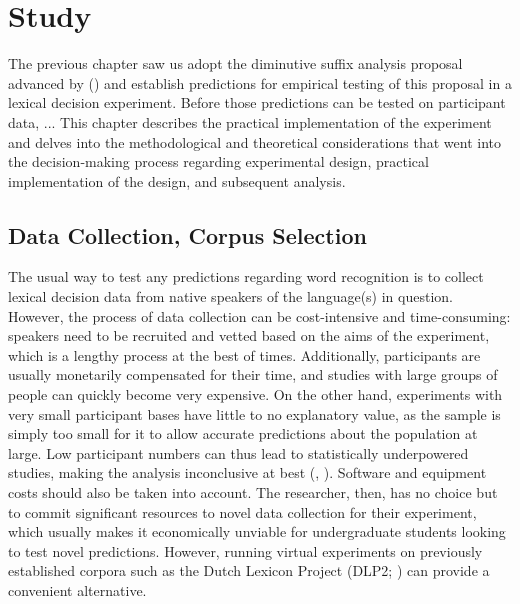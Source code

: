 \chapter{Study}\label{chp:study}
The previous chapter saw us adopt the diminutive suffix analysis proposal advanced by \citeauthor{DeBelder+etal+2014} (\citeyear{DeBelder+etal+2014}) and establish predictions for empirical testing of this proposal in a lexical decision experiment. Before those predictions can be tested on participant data, ... This chapter describes the practical implementation of the experiment and delves into the methodological and theoretical considerations that went into the decision-making process regarding experimental design, practical implementation of the design, and subsequent analysis.

\section{Data Collection, Corpus Selection}
The usual way to test any predictions regarding word recognition is to collect lexical decision data from native speakers of the language(s) in question. However, the process of data collection can be cost-intensive and time-consuming: speakers need to be recruited and vetted based on the aims of the experiment, which is a lengthy process at the best of times. Additionally, participants are usually monetarily compensated for their time, and studies with large groups of people can quickly become very expensive. On the other hand, experiments with very small participant bases have little to no explanatory value, as the sample is simply too small for it to allow accurate predictions about the population at large. Low participant numbers can thus lead to statistically underpowered studies, making the analysis inconclusive at best (\citeauthor{Winter+2019}, \citeyear{Winter+2019}). Software and equipment costs should also be taken into account. The researcher, then, has no choice but to commit significant resources to novel data collection for their experiment, which usually makes it economically unviable for undergraduate students looking to test novel predictions. However, running virtual experiments on previously established corpora such as the Dutch Lexicon Project (DLP2; \cite{Brysbaert+etal+2016}) can provide a convenient alternative.

